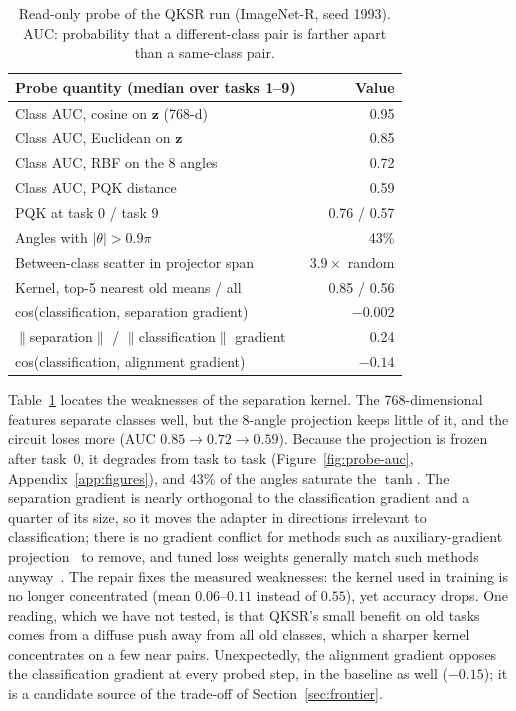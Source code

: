 \begin{table}[t]
\centering
\small
\setlength{\tabcolsep}{3pt}
\begin{tabular}{lr}
\toprule
Probe quantity (median over tasks 1--9) & Value \\
\midrule
Class AUC, cosine on $\mathbf z$ (768-d) & 0.95 \\
Class AUC, Euclidean on $\mathbf z$ & 0.85 \\
Class AUC, RBF on the 8 angles & 0.72 \\
Class AUC, PQK distance & 0.59 \\
\quad PQK at task 0 / task 9 & 0.76 / 0.57 \\
Angles with $|\theta|>0.9\pi$ & 43\% \\
Between-class scatter in projector span & $3.9\times$ random \\
Kernel, top-5 nearest old means / all & 0.85 / 0.56 \\
\midrule
cos(classification, separation gradient) & $-0.002$ \\
$\|$separation$\|$ / $\|$classification$\|$ gradient & 0.24 \\
cos(classification, alignment gradient) & $-0.14$ \\
\bottomrule
\end{tabular}
\caption{Read-only probe of the QKSR run (ImageNet-R, seed 1993). AUC: probability
that a different-class pair is farther apart than a same-class pair.}
\label{tab:probe}
\end{table}

Table~\ref{tab:probe} locates the weaknesses of the separation kernel. The
768-dimensional features separate classes well, but the 8-angle projection
keeps little of it, and the circuit loses more (AUC $0.85\to0.72\to0.59$).
Because the projection is frozen after task~0, it degrades from task to task
(Figure~\ref{fig:probe-auc}, Appendix~\ref{app:figures}),
and 43\% of the angles saturate the $\tanh$. The separation gradient is nearly
orthogonal to the classification gradient and a quarter of its size, so it
moves the adapter in directions irrelevant to classification; there is no
gradient conflict for methods such as auxiliary-gradient
projection~\citep{dery2021attittud} to remove, and tuned loss weights
generally match such methods anyway~\citep{xin2022mtl,kurin2022unitary}. The repair fixes the measured
weaknesses: the kernel used in training is no longer concentrated (mean
$0.06$--$0.11$ instead of $0.55$), yet accuracy drops. One reading, which we
have not tested, is that QKSR's small benefit on old tasks comes from a diffuse
push away from all old classes, which a sharper kernel concentrates on a few
near pairs. Unexpectedly, the alignment gradient opposes the classification
gradient at every probed step, in the baseline as well ($-0.15$); it is a
candidate source of the trade-off of Section~\ref{sec:frontier}.

